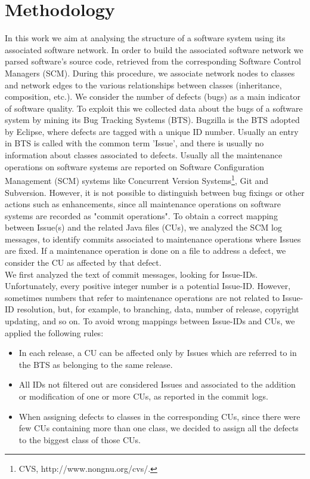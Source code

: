 \section{Methodology}
\label{Methodology}

In this work we aim at analysing the structure of a software system using its associated software network.
In order to build the associated software network we parsed software's source code, retrieved from the corresponding Software Control Managers (SCM). 
During this procedure, we associate network nodes to classes and network edges 
to the various relationships between classes (inheritance, composition, etc.). 
We consider the number of defects (bugs) as a main indicator of software quality. 
To exploit this we collected data about the bugs of a software system by 
mining its Bug Tracking Systems (BTS). 
Bugzilla is the BTS adopted by Eclipse, where defects are tagged with a unique ID number.
Usually an entry in BTS is called with the common term 'Issue', and there is usually 
no information about classes associated to defects.
Usually all the maintenance operations on software systems are reported on Software Configuration Management
(SCM) systems like Concurrent Version Systems\footnote{CVS, http://www.nongnu.org/cvs/.},
Git and Subversion. 
However, it is not possible to distinguish between bug fixings or
other actions such as enhancements, since all maintenance operations on software systems are recorded as "commit 
operations".
To obtain a correct mapping between Issue(s) and the related 
Java files (CUs), 
we analyzed the SCM log messages, to identify commits associated to
maintenance operations where Issues are fixed. 
If a maintenance operation is done on a file to address a defect, 
we consider the CU as affected by that defect. \\
We first analyzed the text of commit messages, looking for Issue-IDs.
Unfortunately, every positive integer number is a potential Issue-ID. However, sometimes
numbers that refer to maintenance operations are not related to Issue-ID resolution, but, for example,
to branching, data, number of release, copyright updating, and so on. 
To avoid wrong mappings between Issue-IDs and CUs, we applied the following rules:
\begin{itemize}
\item In each release, a CU can be affected only by Issues which are referred to in the BTS as belonging to the same release.
\item All IDs not filtered out are considered Issues and associated to the addition or modification of one or more CUs, as reported in the commit logs. 
\item When assigning  defects to classes in the corresponding CUs, since there were 
few CUs containing more than one class, we decided to assign all the defects to the biggest 
class of those CUs.
\end{itemize}

